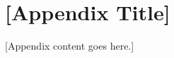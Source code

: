 \documentclass[11pt, letterpaper, oneside]{report}
\begin{document}

\clearpage
{}

\appendix
\chapter{[Appendix Title]}

[Appendix content goes here.]

\end{document}

